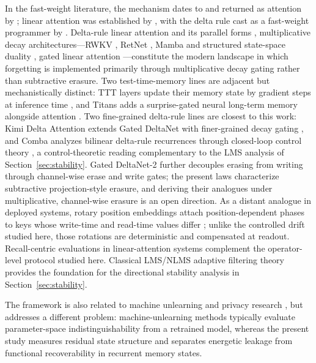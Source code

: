 \documentclass[11pt,a4paper]{article}
\begin{document}
In the fast-weight literature, the mechanism dates to \citet{schmidhuber1992learning} and returned as attention by \citet{ba2016using}; linear attention was established by \citet{katharopoulos2020transformers}, with the delta rule cast as a fast-weight programmer by \citet{schlag2021fastweight}. Delta-rule linear attention and its parallel forms \citep{yang2024deltanet}, multiplicative decay architectures---RWKV \citep{peng2023rwkv}, RetNet \citep{sun2023retentive}, Mamba and structured state-space duality \citep{gu2023mamba,dao2024transformers}, gated linear attention \citep{yang2024gla}---constitute the modern landscape in which forgetting is implemented primarily through multiplicative decay gating rather than subtractive erasure. Two test-time-memory lines are adjacent but mechanistically distinct: TTT layers update their memory state by gradient steps at inference time \citep{sun2024ttt}, and Titans adds a surprise-gated neural long-term memory alongside attention \citep{behrouz2025titans}. Two fine-grained delta-rule lines are closest to this work: Kimi Delta Attention extends Gated DeltaNet \citep{yang2025gateddelta} with finer-grained decay gating \citep{kimi2025linear}, and Comba analyzes bilinear delta-rule recurrences through closed-loop control theory \citep{hu2025comba}, a control-theoretic reading complementary to the LMS analysis of Section~\ref{sec:stability}. Gated DeltaNet-2 \citep{hatamizadeh2026gateddeltanet2} further decouples erasing from writing through channel-wise erase and write gates; the present laws characterize subtractive projection-style erasure, and deriving their analogues under multiplicative, channel-wise erasure is an open direction. As a distant analogue in deployed systems, rotary position embeddings attach position-dependent phases to keys whose write-time and read-time values differ \citep{su2021roformer}; unlike the controlled drift studied here, those rotations are deterministic and compensated at readout. Recall-centric evaluations in linear-attention systems \citep{arora2024simplelinear,arora2024zoology} complement the operator-level protocol studied here. Classical LMS/NLMS adaptive filtering theory \citep{widrow1960adaptive,widrow1985adaptive} provides the foundation for the directional stability analysis in Section~\ref{sec:stability}.

The framework is also related to machine unlearning and privacy research \citep{guo2020certified,bourtoule2021machine,sekhari2021remember}, but addresses a different problem: machine-unlearning methods typically evaluate parameter-space indistinguishability from a retrained model, whereas the present study measures residual state structure and separates energetic leakage from functional recoverability in recurrent memory states.
\end{document}
